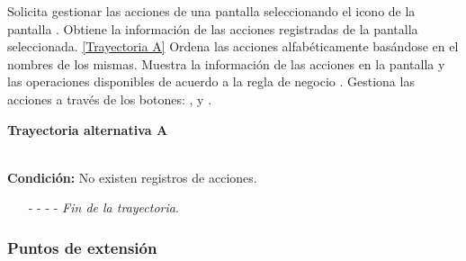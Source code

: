 \begin{UCtrayectoria}
	\UCpaso[\UCactor] Solicita gestionar las acciones de una pantalla seleccionando el icono  de la pantalla .
	\UCpaso[\UCsist] Obtiene la información de las acciones registradas de la pantalla seleccionada. \hyperlink{CU11-1-1:TAA}{[Trayectoria A]}
	\UCpaso[\UCsist] Ordena las acciones alfabéticamente basándose en el nombres de los mismas.
	\UCpaso[\UCsist] Muestra la información de las acciones en la pantalla  y las operaciones disponibles de acuerdo a la regla de negocio . \label{CU11-1-1-P4}
	\UCpaso[\UCactor] Gestiona las acciones a través de los botones: , \editar y \eliminar. 
\end{UCtrayectoria}		
\hypertarget{CU11-1-1:TAA}{\textbf{Trayectoria alternativa A}}\\
\noindent \textbf{Condición:} No existen registros de acciones.
\begin{enumerate}
	\UCpaso[\UCsist] Muestra el mensaje  en la pantalla  para indicar que no hay registros de acciones para mostrar.  \label{CU11-1-1-TA1}
	\UCpaso[\UCactor] Gestiona las acciones a través del botón: . 
	\item[- -] - - {\em {Fin de la trayectoria}}.%
\end{enumerate}
\subsubsection{Puntos de extensión}

